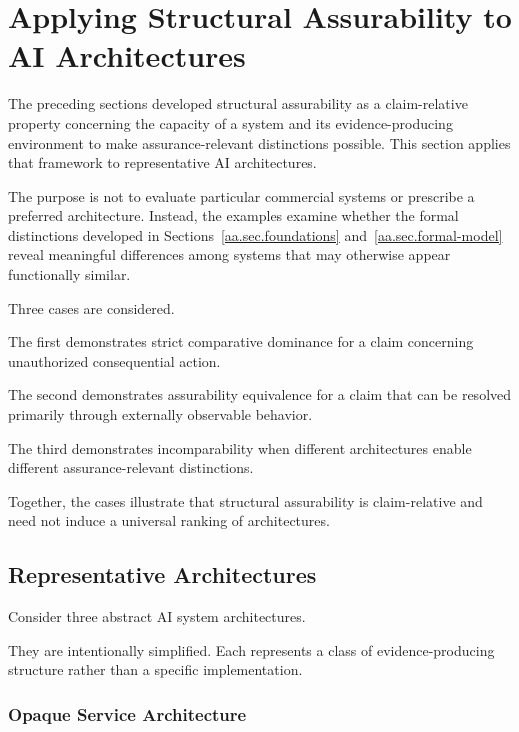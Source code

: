 
\section{Applying Structural Assurability to AI Architectures}
\label{aa.sec.applications}

The preceding sections developed structural assurability as a claim-relative
property concerning the capacity of a system and its evidence-producing
environment to make assurance-relevant distinctions possible.
This section applies that framework to representative AI architectures.

The purpose is not to evaluate particular commercial systems or prescribe
a preferred architecture.
Instead, the examples examine whether the formal distinctions developed in
Sections~\ref{aa.sec.foundations} and~\ref{aa.sec.formal-model}
reveal meaningful differences among systems that may otherwise appear
functionally similar.

Three cases are considered.

The first demonstrates strict comparative dominance for a claim concerning
unauthorized consequential action.

The second demonstrates assurability equivalence for a claim that can be
resolved primarily through externally observable behavior.

The third demonstrates incomparability when different architectures enable
different assurance-relevant distinctions.

Together, the cases illustrate that structural assurability is claim-relative
and need not induce a universal ranking of architectures.

\subsection{Representative Architectures}
\label{aa.subsec.representative-architectures}

Consider three abstract AI system architectures.

They are intentionally simplified.
Each represents a class of evidence-producing structure rather than a
specific implementation.

\subsubsection{Opaque Service Architecture}


